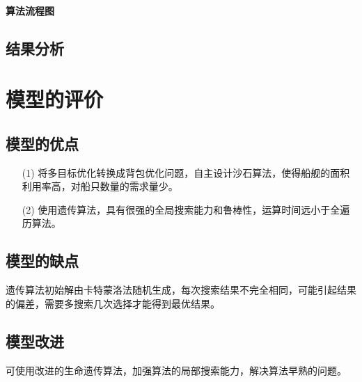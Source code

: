 \documentclass{whutmod}
\begin{document}
     \paragraph{算法流程图}
	
	

	
	\subsection{结果分析}
     



	\section{模型的评价}
	\subsection{模型的优点}
		\begin{itemize}                                             

		\item [(1)] 将多目标优化转换成背包优化问题，自主设计沙石算法，使得船舰的面积利用率高，对船只数量的需求量少。
		\item [(2)] 使用遗传算法，具有很强的全局搜索能力和鲁棒性，运算时间远小于全遍历算法。
	\end{itemize}
	\subsection{模型的缺点}
	遗传算法初始解由卡特蒙洛法随机生成，每次搜索结果不完全相同，可能引起结果的偏差，需要多搜索几次选择才能得到最优结果。
	\subsection{模型改进}
	可使用改进的生命遗传算法，加强算法的局部搜索能力，解决算法早熟的问题。
 
\end{document}
